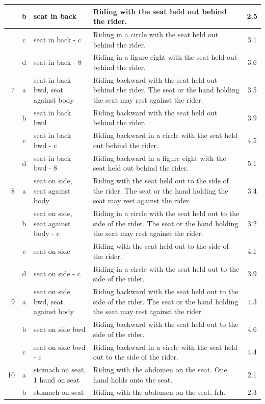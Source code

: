\begin{longtable}{|r|c|p{4cm}|p{8cm}|c|}
\hline
  & b & seat in back  & Riding with the seat held out behind the rider. & 2.5 \\ 
\hline
  & c & seat in back - c  & Riding in a circle with the seat held out behind the rider. & 3.1 \\ 
\hline
  & d & seat in back - 8  & Riding in a figure eight with the seat held out behind the rider. & 3.6 \\ 
\hline
7 & a & seat in back bwd, seat against body & Riding backward with the seat held out behind the rider. The seat or the hand holding the seat may rest against the rider.  & 3.5 \\ 
\hline
  & b & seat in back bwd  & Riding backward with the seat held out behind the rider.  & 3.9 \\ 
\hline
  & c & seat in back bwd - c  & Riding backward in a circle with the seat held out behind the rider.  & 4.5 \\ 
\hline
  & d & seat in back bwd - 8  & Riding backward in a figure eight with the seat held out behind the rider.  & 5.1 \\ 
\hline
8 & a & seat on side, seat against body & Riding with the seat held out to the side of the rider. The seat or the hand holding the seat may rest against the rider. & 3.4 \\ 
\hline
  & b & seat on side, seat against body - c & Riding in a circle with the seat held out to the side of the rider. The seat or the hand holding the seat may rest against the rider. & 3.2 \\ 
\hline
  & c & seat on side  & Riding with the seat held out to the side of the rider. & 4.1 \\ 
\hline
  & d & seat on side - c  & Riding in a circle with the seat held out to the side of the rider. & 3.9 \\ 
\hline
9 & a & seat on side bwd, seat against body & Riding backward with the seat held out to the side of the rider. The seat or the hand holding the seat may rest against the rider.  & 4.3 \\ 
\hline
  & b & seat on side bwd  & Riding backward with the seat held out to the side of the rider.  & 4.6 \\ 
\hline
  & c & seat on side bwd - c  & Riding backward in a circle with the seat held out to the side of the rider.  & 4.4 \\ 
\hline
10  & a & stomach on seat, 1 hand on seat & Riding with the abdomen on the seat. One hand holds onto the seat.  & 2.1 \\ 
\hline
  & b & stomach on seat & Riding with the abdomen on the seat, frh. & 2.3 \\ 

\end{longtable}
